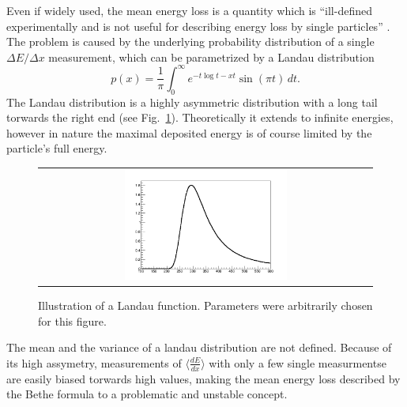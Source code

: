 Even if widely used, the mean energy loss is a quantity which is ``ill-defined experimentally and is not useful for describing energy loss by single particles'' \cite{bib:PDG_2014}.
The problem is caused by the underlying probability distribution of a single $\Delta E/ \Delta x $ measurement, which can be parametrized by a Landau distribution \cite{bib:Landau_1944}
\begin{equation}
p(x) = \frac{1}{\pi} \int_0^\infty\! e^{-t \log t - x t} \sin(\pi t)\, dt.
\label{eq:landau}
\end{equation}
The Landau distribution is a highly asymmetric distribution with a long tail torwards the right end (see Fig.~\ref{fig:landau}).
Theoretically it extends to infinite energies, however in nature the maximal deposited energy is of course limited by the particle's full energy.
\begin{figure}[!t]
  \centering 
  \begin{tabular}{c}
  \includegraphics[width=0.5\textwidth]{figures/analysis/landau.png}
  \end{tabular}
  \caption{Illustration of a Landau function. Parameters were arbitrarily chosen for this figure.} 
  \label{fig:landau}
\end{figure}
The mean and the variance of a landau distribution are not defined.
Because of its high assymetry, measurements of $\langle \frac{dE}{dx} \rangle$ with only a few single measurmentse are easily biased torwards high values, making the mean energy loss described by the Bethe formula to a problematic and unstable concept. 



